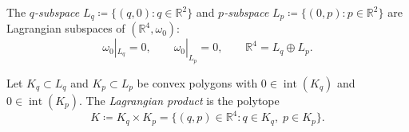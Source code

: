 %
%


\begin{definition}\label{def:lagrangian-subspaces}
The \emph{$q$-subspace} $L_q \coloneqq \{(q, 0) : q \in \mathbb{R}^2\}$
and \emph{$p$-subspace} $L_p \coloneqq \{(0, p) : p \in \mathbb{R}^2\}$
are Lagrangian subspaces of $(\mathbb{R}^4, \omega_0)$:
\[
  \omega_0|_{L_q} = 0, \qquad
  \omega_0|_{L_p} = 0, \qquad
  \mathbb{R}^4 = L_q \oplus L_p.
\]
\end{definition}

\begin{definition}\label{def:lagrangian-product}
Let $K_q \subset L_q$ and $K_p \subset L_p$ be convex polygons
with $0 \in \operatorname{int}(K_q)$ and $0 \in \operatorname{int}(K_p)$.
The \emph{Lagrangian product} is the polytope
\[
  K \coloneqq K_q \times K_p
  = \{ (q, p) \in \mathbb{R}^4 : q \in K_q,\; p \in K_p \}.
\]
\end{definition}

